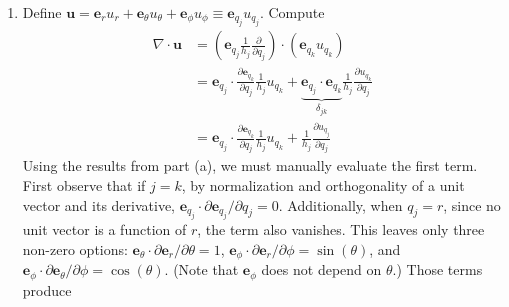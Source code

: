 \documentclass[a4paper]{article}
\begin{document}
\begin{enumerate}[label=(\alph*)]
\textbf{The elegant way}. For a scalar function \( f \), the coordinate-free definition of the gradient is 
\[
	df = \nabla f \cdot d \pmb{s}  
\]
where we have the infinitesimal displacement
\[
	d \pmb{s} = \pmb{e}_{r} dr + \pmb{e}_{\theta}r \, d \theta + \pmb{e}_{\phi}r \sin\!\left(\theta\right) \, d \phi \equiv \pmb{e}_{q_{j}}h_{j}dq_{j}
\]
and by the chain rule
\[
	df = \frac{\partial f}{\partial r}dr + \frac{\partial f}{\partial \theta}d \theta + \frac{\partial f}{\partial \phi}d \phi \equiv \frac{\partial f}{\partial q_{j}}dq_{j} 
\]
Next, define \( \nabla f \) as 
\[
	\nabla f = \pmb{e}_{r}F_{r} + \pmb{e}_{\theta}F_{\theta} + \pmb{e}_{\phi}F_{\phi} \equiv \pmb{e}_{q_{j}}F_{j}
\]
By orthogonality, \( \pmb{e}_{q_{j}} \cdot \pmb{e}_{q_{k}} = \delta_{jk} \). Dotting \( \nabla f \) with \( d \pmb{s} \) yields
\[
	F_{r}dr + F_{\theta}r d \theta + F_{\phi}r \sin\!\left(\theta\right)d \phi 
\]
which allows us to deduce
\[
	F_{r} = \frac{\partial f}{\partial r}, \quad F_{\theta} = \frac{1}{r}\frac{\partial f}{\partial \theta}, \quad F_{\phi} = \frac{1}{r \sin\!\left(\theta\right)}\frac{\partial f}{\partial \phi} 
\]
which are precisely the components to the gradient operator in spherical polar coordinates. Much easier!
	\item Define \( \pmb{u} = \pmb{e}_{r}u_{r} + \pmb{e}_{\theta}u_{\theta} + \pmb{e}_{\phi}u_{\phi} \equiv \pmb{e}_{q_{j}}u_{q_{j}} \). Compute
	\begin{align*}
		\nabla \cdot \pmb{u} & = \!\left( \pmb{e}_{q_{j}}\frac{1}{h_{j}}\frac{\partial }{\partial q_{j}} \right) \cdot \!\left( \pmb{e}_{q_{k}}u_{q_{k}} \right) \\
				     & = \pmb{e}_{q_{j}} \cdot \frac{\partial \pmb{e}_{q_{k}}}{\partial q_{j}}\frac{1}{h_{j}}u_{q_{k}} + \underbrace{\pmb{e}_{q_{j}} \cdot \pmb{e}_{q_{k}}}_{\delta_{jk}}\frac{1}{h_{j}}\frac{\partial u_{q_{k}}}{\partial q_{j}} \\
				     & = \pmb{e}_{q_{j}} \cdot \frac{\partial \pmb{e}_{q_{k}}}{\partial q_{j}}\frac{1}{h_{j}}u_{q_{k}} + \frac{1}{h_{j}}\frac{\partial u_{q_{j}}}{\partial q_{j}}
	\end{align*}
	Using the results from part (a), we must manually evaluate the first term. First observe that if \( j = k \), by normalization and orthogonality of a unit vector and its derivative, \( \pmb{e}_{q_{j}} \cdot \partial \pmb{e}_{q_{j}} / \partial q_{j} = 0 \). Additionally, when \( q_{j} = r \), since no unit vector is a function of \( r \), the term also vanishes. This leaves only three non-zero options: \( \pmb{e}_{\theta} \cdot \partial \pmb{e}_{r} / \partial \theta = 1 \), \( \pmb{e}_{\phi} \cdot \partial \pmb{e}_{r} / \partial \phi = \sin\!\left(\theta\right) \), and \( \pmb{e}_{\phi} \cdot \partial \pmb{e}_{\theta} / \partial \phi = \cos\!\left(\theta\right) \). (Note that \( \pmb{e}_{\phi} \) does not depend on \( \theta \).) Those terms produce

\end{enumerate}
\end{document}
